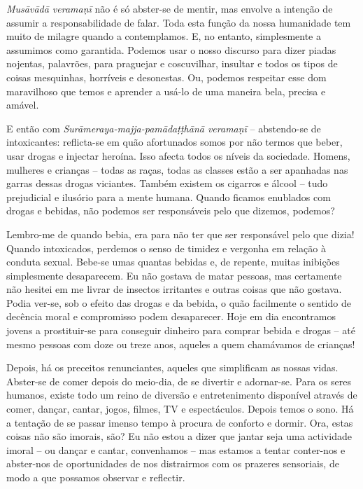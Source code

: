 \emph{Musāvādā veramaṇī} não é só abster-se de mentir, mas envolve a intenção de
assumir a responsabilidade de falar. Toda esta função da nossa humanidade tem
muito de milagre quando a contemplamos. E, no entanto, simplesmente a assumimos
como garantida. Podemos usar o nosso discurso para dizer piadas nojentas,
palavrões, para praguejar e coscuvilhar, insultar e todos os tipos de coisas
mesquinhas, horríveis e desonestas. Ou, podemos respeitar esse dom maravilhoso
que temos e aprender a usá-lo de uma maneira bela, precisa e amável.

E então com \emph{Surāmeraya-majja-pamādaṭṭhānā veramaṇī} -- abstendo-se de
intoxicantes: reflicta-se em quão afortunados somos por não termos que beber,
usar drogas e injectar heroína. Isso afecta todos os níveis da sociedade.
Homens, mulheres e crianças -- todas as raças, todas as classes estão a ser
apanhadas nas garras dessas drogas viciantes. Também existem os cigarros e
álcool -- tudo prejudicial e ilusório para a mente humana. Quando ficamos
enublados com drogas e bebidas, não podemos ser responsáveis pelo que dizemos,
podemos?

Lembro-me de quando bebia, era para não ter que ser responsável pelo que dizia!
Quando intoxicados, perdemos o senso de timidez e vergonha em relação à conduta
sexual. Bebe-se umas quantas bebidas e, de repente, muitas inibições
simplesmente desaparecem. Eu não gostava de matar pessoas, mas certamente não
hesitei em me livrar de insectos irritantes e outras coisas que não gostava.
Podia ver-se, sob o efeito das drogas e da bebida, o quão facilmente o sentido
de decência moral e compromisso podem desaparecer. Hoje em dia encontramos
jovens a prostituir-se para conseguir dinheiro para comprar bebida e drogas --
até mesmo pessoas com doze ou treze anos, aqueles a quem chamávamos de crianças!

Depois, há os preceitos renunciantes, aqueles que simplificam as nossas vidas.
Abster-se de comer depois do meio-dia, de se divertir e adornar-se. Para os
seres humanos, existe todo um reino de diversão e entretenimento disponível
através de comer, dançar, cantar, jogos, filmes, TV e espectáculos. Depois temos
o sono. Há a tentação de se passar imenso tempo à procura de conforto e dormir.
Ora, estas coisas não são imorais, são? Eu não estou a dizer que jantar seja uma
actividade imoral -- ou dançar e cantar, convenhamos -- mas estamos a tentar
conter-nos e abster-nos de oportunidades de nos distrairmos com os prazeres
sensoriais, de modo a que possamos observar e reflectir.

